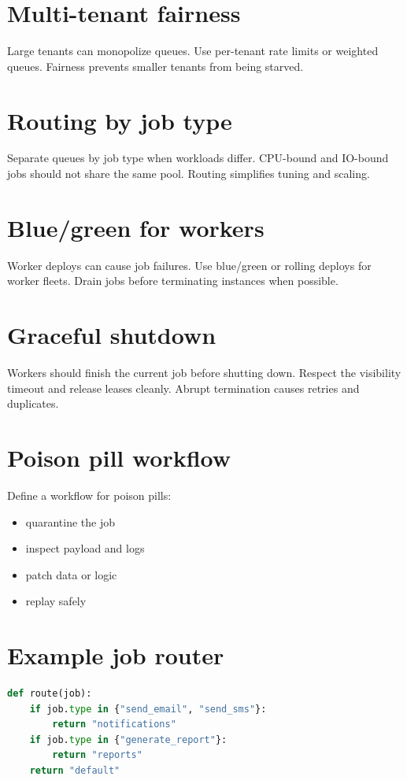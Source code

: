 \section{Multi-tenant fairness}
Large tenants can monopolize queues.
Use per-tenant rate limits or weighted queues.
Fairness prevents smaller tenants from being starved.

\section{Routing by job type}
Separate queues by job type when workloads differ.
CPU-bound and IO-bound jobs should not share the same pool.
Routing simplifies tuning and scaling.

\section{Blue/green for workers}
Worker deploys can cause job failures.
Use blue/green or rolling deploys for worker fleets.
Drain jobs before terminating instances when possible.

\section{Graceful shutdown}
Workers should finish the current job before shutting down.
Respect the visibility timeout and release leases cleanly.
Abrupt termination causes retries and duplicates.

\section{Poison pill workflow}
Define a workflow for poison pills:
\begin{itemize}[nosep]
  \item quarantine the job
  \item inspect payload and logs
  \item patch data or logic
  \item replay safely
\end{itemize}

\section{Example job router}
\begin{lstlisting}[language=Python]
def route(job):
    if job.type in {"send_email", "send_sms"}:
        return "notifications"
    if job.type in {"generate_report"}:
        return "reports"
    return "default"
\end{lstlisting}

